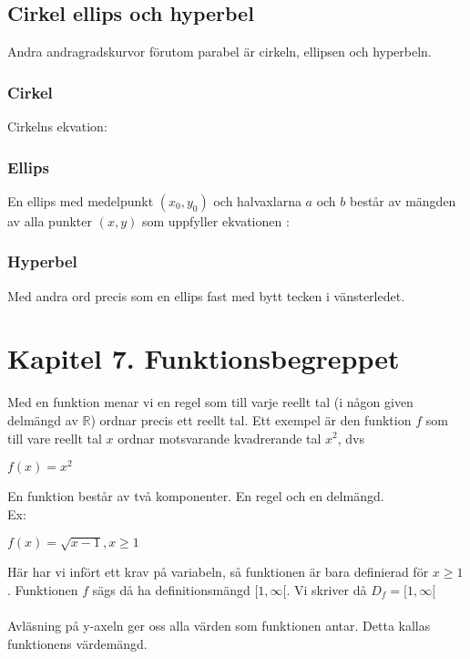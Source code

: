 \documentclass[11pt]{article}
\begin{document}
\subsection{Cirkel ellips och hyperbel}
Andra andragradskurvor förutom parabel är cirkeln, ellipsen och hyperbeln. 

\subsubsection{Cirkel}
Cirkelns ekvation:
\begin{center}
\end{center}
\subsubsection{Ellips}
\begin{figure}[h]
  \begin{center}
  \end{center}
  \label{bild5}
\end{figure} 
En ellips med medelpunkt $(x_0,y_0)$ och halvaxlarna $a$ och $b$ består av mängden av alla punkter $(x,y)$ som uppfyller ekvationen : 
\begin{center}
\end{center}
\subsubsection{Hyperbel}
\begin{figure}[h]
  \begin{center}
  \end{center}
  \label{bild3}
\end{figure} 
\begin{center}
\end{center}
Med andra ord precis som en ellips fast med bytt tecken i vänsterledet. 
\section{Kapitel 7. Funktionsbegreppet}
Med en funktion menar vi en regel som till varje reellt tal (i någon given delmängd av $\mathbb{R}$) ordnar precis ett reellt tal. Ett exempel är den funktion $f$ som till vare reellt tal $x$ ordnar motsvarande kvadrerande tal $x^2$, dvs
\begin{center}
$f(x)=x^2$
\end{center}
En funktion består av två komponenter. En regel och en delmängd. \\
Ex:
\begin{center}
$f(x) = \sqrt{x-1}, x \geq 1$
\end{center}
Här har vi infört ett krav på variabeln, så funktionen är bara definierad för $x \geq 1$. Funktionen $f$ sägs då ha definitionsmängd $[1,\infty[$. Vi skriver då $D_f = [1,\infty[$
\\ \\
Avläsning på y-axeln ger oss alla värden som funktionen antar. Detta kallas funktionens värdemängd. 
\end{document}
